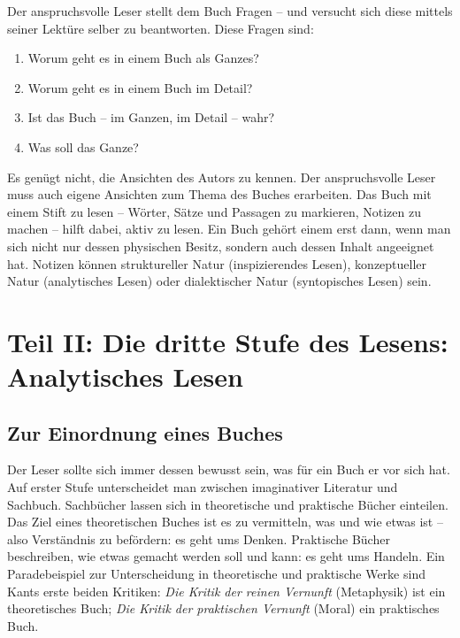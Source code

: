 \documentclass[a4paper,11pt]{scrartcl}
\begin{document}
Der anspruchsvolle Leser stellt dem Buch Fragen – und versucht sich diese mittels seiner Lektüre selber zu beantworten. Diese Fragen sind:

\begin{enumerate}
    \item Worum geht es in einem Buch als Ganzes?
    \item Worum geht es in einem Buch im Detail?
    \item Ist das Buch – im Ganzen, im Detail – wahr?
    \item Was soll das Ganze?
\end{enumerate}

Es genügt nicht, die Ansichten des Autors zu kennen. Der anspruchsvolle Leser muss auch eigene Ansichten zum Thema des Buches erarbeiten. Das Buch mit einem Stift zu lesen – Wörter, Sätze und Passagen zu markieren, Notizen zu machen – hilft dabei, aktiv zu lesen. Ein Buch gehört einem erst dann, wenn man sich nicht nur dessen physischen Besitz, sondern auch dessen Inhalt angeeignet hat. Notizen können struktureller Natur (inspizierendes Lesen), konzeptueller Natur (analytisches Lesen) oder dialektischer Natur (syntopisches Lesen) sein.

\newpage
\section*{Teil II: Die  dritte Stufe des Lesens: Analytisches Lesen}

\subsection{Zur Einordnung eines Buches}

Der Leser sollte sich immer dessen bewusst sein, was für ein Buch er vor sich hat. Auf erster Stufe unterscheidet man zwischen imaginativer Literatur und Sachbuch. Sachbücher lassen sich in theoretische und praktische Bücher einteilen. Das Ziel eines theoretischen Buches ist es zu vermitteln, was und wie etwas ist – also Verständnis zu befördern: es geht ums Denken. Praktische Bücher beschreiben, wie etwas gemacht werden soll und kann: es geht ums Handeln. Ein Paradebeispiel zur Unterscheidung in theoretische und praktische Werke sind Kants erste beiden Kritiken: \textit{Die Kritik der reinen Vernunft} (Metaphysik) ist ein theoretisches Buch; \textit{Die Kritik der praktischen Vernunft} (Moral) ein praktisches Buch.
\end{document}
